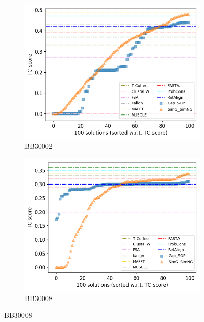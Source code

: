 \begin{figure}[!htbp]
	
	\begin{adjustwidth}{-1cm}{-1cm}
		\centering
		\begin{subfigure}{0.22\textwidth}
			\includegraphics[width=\columnwidth]{Figure/summary/precomputedInit/Balibase/BB30002_tc_density_single_run_2}
			\caption{BB30002}
		\end{subfigure}	
		\begin{subfigure}{0.22\textwidth}
			\includegraphics[width=\columnwidth]{Figure/summary/precomputedInit/Balibase/BB30008_tc_density_single_run_2}
			\caption{BB30008}

\end{subfigure}
\end{adjustwidth}
\end{figure}
